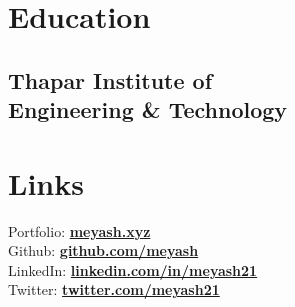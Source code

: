 \documentclass[]{deedy-resume-openfont}
\begin{document}
%
%
\lastupdated

%
%

%
%

\begin{minipage}[t]{0.34\textwidth} 


\section{Education} 

\subsection{Thapar Institute of \\ Engineering \& Technology}
\vspace{\topsep} %
\sectionsep



\section{Links} 
Portfolio: \href{https://meyash.xyz}{\bf meyash.xyz} \\
Github: \href{https://github.com/meyash}{\bf github.com/meyash} \\
LinkedIn:  \href{https://www.linkedin.com/in/meyash21}{\bf linkedin.com/in/meyash21} \\
Twitter:  \href{https://twitter.com/meyash21}{\bf twitter.com/meyash21}
\sectionsep


\end{minipage}
\end{document}
